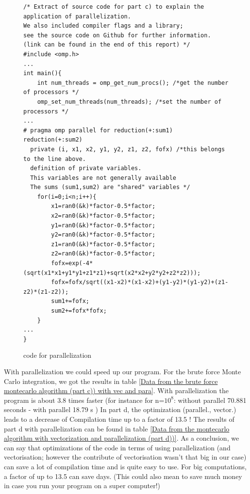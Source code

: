 \documentclass[10pt,a4paper]{article}
\begin{document}
\begin{figure}[h]
\caption{code for parallelization}
\label{code for parallel}
\begin{lstlisting}
/* Extract of source code for part c) to explain the application of parallelization.
We also included compiler flags and a library; 
see the source code on Github for further information. 
(link can be found in the end of this report) */
#include <omp.h>
...
int main(){
    int num_threads = omp_get_num_procs(); /*get the number of processors */
    omp_set_num_threads(num_threads); /*set the number of processors */
...
# pragma omp parallel for reduction(+:sum1) reduction(+:sum2) 
  private (i, x1, x2, y1, y2, z1, z2, fofx) /*this belongs to the line above. 
  definition of private variables. 
  This variables are not generally available
  The sums (sum1,sum2) are "shared" variables */
    for(i=0;i<n;i++){
        x1=ran0(&k)*factor-0.5*factor;
        x2=ran0(&k)*factor-0.5*factor;
        y1=ran0(&k)*factor-0.5*factor;
        y2=ran0(&k)*factor-0.5*factor;
        z1=ran0(&k)*factor-0.5*factor;
        z2=ran0(&k)*factor-0.5*factor;
        fofx=exp(-4*(sqrt(x1*x1+y1*y1+z1*z1)+sqrt(x2*x2+y2*y2+z2*z2)));
        fofx=fofx/sqrt((x1-x2)*(x1-x2)+(y1-y2)*(y1-y2)+(z1-z2)*(z1-z2));
        sum1+=fofx;
        sum2+=fofx*fofx;
    }
...
}
\end{lstlisting}
\end{figure}

With parallelization we could speed up our program. For the brute force Monte Carlo integration, we got the results in table \ref{Data from the brute force montecarlo algorithm (part c)) with vec and para}. With parallelization the program is about 3.8 times faster (for instance for n=$10^8$: without parallel 70.881 seconds - with parallel 18.79 s )
In part d, the optimization (parallel., vector.) leads to a decrease of Compilation time up to a factor of 13.5 ! The results of part d with parallelization can be found in table \ref{Data from the  montecarlo algorithm with vectorization and parallelization (part d))}. As a conclusion, we can say that optimizations of the code in terms of using parallelization (and vectorisation; however the contribute of vectorisation wasn't that big in our case) can save a lot of compilation time and is quite easy to use. For big computations, a factor of up to 13.5 can save days. (This could also mean to save much money in case you run your program on a super computer!)
\end{document}
